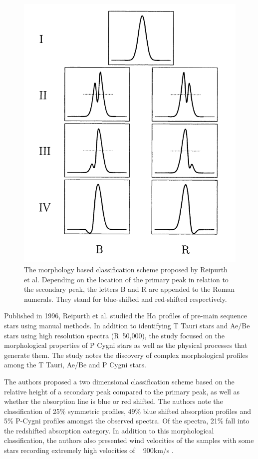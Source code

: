 \begin{figure}[h]
\centering
\includegraphics[scale=0.75]{figures/reipurth classes.png}
\caption{The morphology based classification scheme proposed by Reipurth et al. Depending on the location of the primary peak in relation to the secondary peak, the letters B and R are appended to the Roman numerals. They stand for blue-shifted and red-shifted respectively.}
\end{figure}

Published in 1996, Reipurth et al. studied the H$\alpha$ profiles of pre-main sequence stars using manual methods. In addition to identifying T Tauri stars and Ae/Be stars using high resolution spectra (R~50,000), the study focused on the morphological properties of P Cygni stars as well as the physical processes that generate them. The study notes the discovery of complex morphological profiles among the T Tauri, Ae/Be and P Cygni stars. 

The authors proposed a two dimensional classification scheme based on the relative height of a secondary peak compared to the primary peak, as well as whether the absorption line is blue or red shifted. The authors note the classification of 25\% symmetric profiles, 49\% blue shifted absorption profiles and 5\% P-Cygni profiles amongst the observed spectra. Of the spectra, 21\% fall into the redshifted absorption category. In addition to this morphological classification, the authors also presented wind velocities of the samples with some stars recording extremely high velocities of ~ 900km/s \cite{reipurth1996halpha}. 

